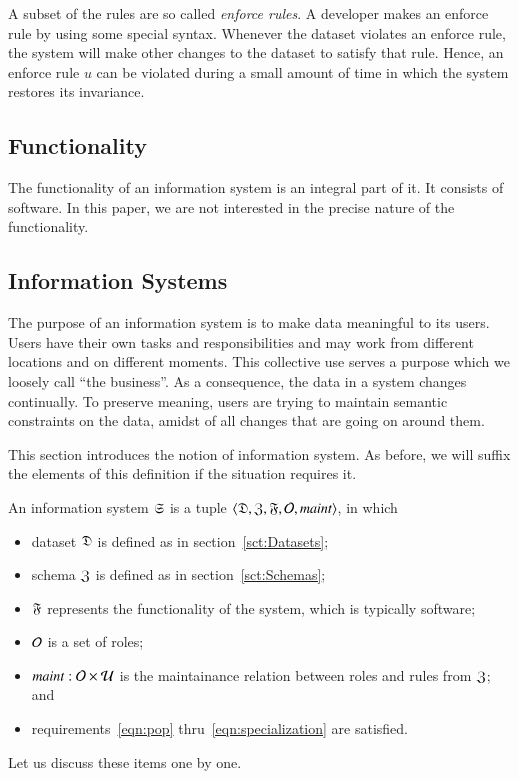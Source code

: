 \documentclass{elsarticle}
\begin{document}
   A subset of the rules are so called {\em enforce rules}.
   A developer makes an enforce rule by using some special syntax.
   Whenever the dataset violates an enforce rule,
   the system will make other changes to the dataset to satisfy that rule.
   Hence, an enforce rule $u$ can be violated during a small amount of time in which the system restores its invariance.

\subsection{Functionality}
   The functionality of an information system is an integral part of it.
   It consists of software.
   In this paper, we are not interested in the precise nature of the functionality.

\subsection{Information Systems}
\label{sct:Information Systems}
   The purpose of an information system is to make data meaningful to its users.
   Users have their own tasks and responsibilities
   and may work from different locations and on different moments.
   This collective use serves a purpose which we loosely call ``the business''.
   As a consequence, the data in a system changes continually.
   To preserve meaning, users are trying to maintain semantic constraints on the data,
   amidst of all changes that are going on around them.

   This section introduces the notion of information system.
   As before, we will suffix the elements of this definition if the situation requires it.
\begin{definition}
\label{def:information system}
\item An information system $\mathfrak{S}$ is a tuple $\langle\mathfrak{D},\mathfrak{Z},\mathfrak{F},\mathcal{O},\text{\it maint\/}\rangle$, in which
\begin{itemize}
   \item dataset $\mathfrak{D}$ is defined as in section~\ref{sct:Datasets};
   \item schema $\mathfrak{Z}$ is defined as in section~\ref{sct:Schemas};
   \item $\mathfrak{F}$ represents the functionality of the system, which is typically software;
   \item $\mathcal{O}$ is a set of roles;
   \item $\text{\it maint\/} : \mathcal{O}\times\mathcal{U}$ is the maintainance relation between roles and rules from $\mathfrak{Z}$; and
   \item requirements~\ref{eqn:pop} thru~\ref{eqn:specialization} are satisfied.
\end{itemize}
\end{definition}
   Let us discuss these items one by one.
\end{document}
